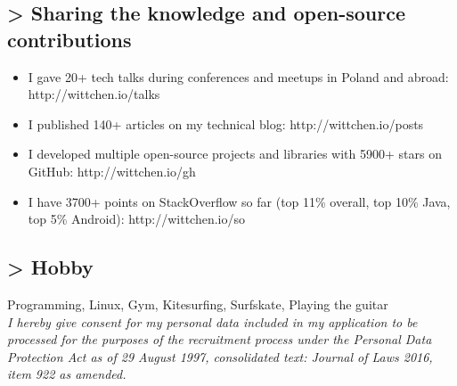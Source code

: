 \documentclass[8pt]{extarticle}
\begin{document}
    \subsection*{\normalsize{> Sharing the knowledge and open-source contributions}}
    \begin{itemize}
      \item I gave 20+ tech talks during conferences and meetups in Poland and abroad: http://wittchen.io/talks
      \item I published 140+ articles on my technical blog: http://wittchen.io/posts
      \item I developed multiple open-source projects and libraries with 5900+ stars on GitHub: http://wittchen.io/gh
      \item I have 3700+ points on StackOverflow so far (top 11\% overall, top 10\% Java, top 5\% Android): http://wittchen.io/so
    \end{itemize}

    \subsection*{\normalsize{> Hobby}}
    Programming, Linux, Gym, Kitesurfing, Surfskate, Playing the guitar\\

    \textit{
    I hereby give consent for my personal data included in my application
    to be processed for the purposes of the recruitment process
    under the Personal Data Protection Act as of 29 August 1997,
    consolidated text: Journal of Laws 2016, item 922 as amended.
    }
\end{document}

